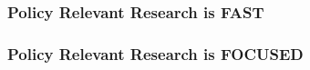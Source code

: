 \documentclass{beamer}
\begin{document}
{
\begin{frame}[plain]
\frametitle{Policy Relevant Research is FAST}
\end{frame}
}

{
\begin{frame}[plain]
\frametitle{Policy Relevant Research is FOCUSED}
\end{frame}
}
\end{document}
